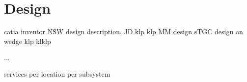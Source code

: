 
\section{Design}
catia
inventor
NSW design description, JD klp klp 
MM design
sTGC design
on wedge klp klklp 

...

services
per location
per subsystem

